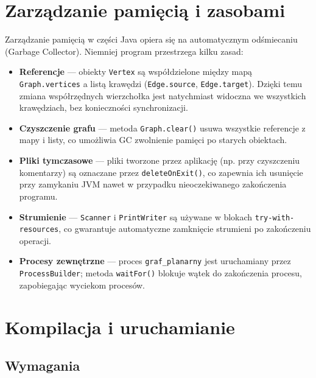 \documentclass[a4paper, 11pt]{article}
\begin{document}
\section{Zarządzanie pamięcią i zasobami}

Zarządzanie pamięcią w części Java opiera się
na automatycznym odśmiecaniu (Garbage Collector). Niemniej program
przestrzega kilku zasad:

\begin{itemize}
  \item \textbf{Referencje} --- obiekty \texttt{Vertex} są współdzielone
    między mapą \texttt{Graph.vertices} a listą krawędzi
    (\texttt{Edge.source}, \texttt{Edge.target}). Dzięki temu zmiana
    współrzędnych wierzchołka jest natychmiast widoczna we wszystkich
    krawędziach, bez konieczności synchronizacji.
  \item \textbf{Czyszczenie grafu} --- metoda \texttt{Graph.clear()}
    usuwa wszystkie referencje z mapy i listy, co umożliwia GC
    zwolnienie pamięci po starych obiektach.
  \item \textbf{Pliki tymczasowe} --- pliki tworzone przez aplikację
    (np. przy czyszczeniu komentarzy) są oznaczane przez
    \texttt{deleteOnExit()}, co zapewnia ich usunięcie przy zamykaniu JVM
    nawet w przypadku nieoczekiwanego zakończenia programu.
  \item \textbf{Strumienie} --- \texttt{Scanner} i \texttt{PrintWriter}
    są używane w blokach \texttt{try-with-resources}, co gwarantuje
    automatyczne zamknięcie strumieni po zakończeniu operacji.
  \item \textbf{Procesy zewnętrzne} --- proces \texttt{graf\_planarny}
    jest uruchamiany przez \texttt{ProcessBuilder}; metoda
    \texttt{waitFor()} blokuje wątek do zakończenia procesu,
    zapobiegając wyciekom procesów.
\end{itemize}

\section{Kompilacja i uruchamianie}

\subsection{Wymagania}
\end{document}
